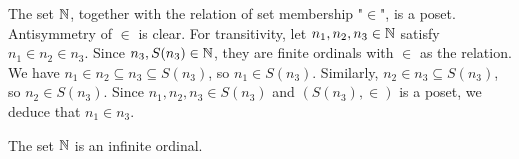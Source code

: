 \begin{remark} 
    The set $\operatorname{\mathbb N}$, together with the relation of set membership "$\in$", is a poset. Antisymmetry of $\in$ is clear. For transitivity, let $n_1, n_2, n_3 \in \operatorname{\mathbb N}$ satisfy $n_1 \in n_2 \in n_3$. Since $n_3, S(n_3) \in \operatorname{\mathbb N}$, they are finite ordinals with $\in$ as the relation. We have $n_1 \in n_2 \subseteq n_3 \subseteq S(n_3)$, so $n_1 \in S(n_3)$. Similarly, $n_2 \in n_3 \subseteq S(n_3)$, so $n_2 \in S(n_3)$. Since $n_1, n_2, n_3 \in S(n_3)$ and $(S(n_3), \in)$ is a poset, we deduce that $n_1 \in n_3$. 
\end{remark}

\begin{theorem} \label{well-ordering-of-the-naturals}
    The set $\operatorname{\mathbb N}$ is an infinite ordinal.
\end{theorem}

